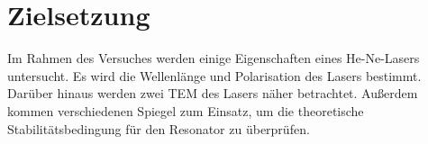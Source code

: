 \section{Zielsetzung}
\label{sec:Zielsetzung}

Im Rahmen des Versuches werden einige Eigenschaften eines He-Ne-Lasers untersucht. 
Es wird die Wellenlänge und Polarisation des Lasers bestimmt. 
Darüber hinaus werden zwei TEM des Lasers näher betrachtet. Außerdem kommen verschiedenen Spiegel zum Einsatz, 
um die theoretische Stabilitätsbedingung für den Resonator zu überprüfen. 

